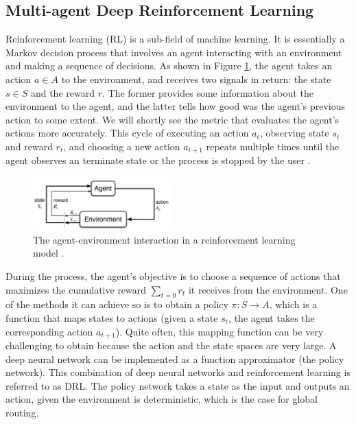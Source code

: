 \documentclass[conference]{IEEEtran}
\begin{document}
\subsection{Multi-agent Deep Reinforcement Learning}
Reinforcement learning (RL) is a sub-field of machine learning. It is essentially a Markov decision process that involves an agent interacting with an environment and making a sequence of decisions. As shown in Figure \ref{fig:rl}, the agent takes an action $a \in A$ to the environment, and receives two signals in return: the state $s \in S$ and the reward $r$. The former provides some information about the environment to the agent, and the latter tells how good was the agent's previous action to some extent. We will shortly see the metric that evaluates the agent's actions more accurately. This cycle of executing an action $a_{t}$, observing state $s_{t}$ and reward $r_{t}$, and choosing a new action $a_{t+1}$ repeats multiple times until the agent observes an terminate state or the process is stopped by the user \cite{SB}.

\begin{figure}[h!]
    \centering
    \includegraphics[width = 0.48\textwidth]{figures/rl.png}
    \caption{The agent-environment interaction in a reinforcement learning model \cite{SB}.}
    \label{fig:rl}
\end{figure}

During the process, the agent's objective is to choose a sequence of actions that maximizes the cumulative reward $\sum_{t=0} r_{t}
$ it receives from the environment. One of the methods it can achieve so is to obtain a policy $\pi:S \rightarrow A$, which is a function that maps states to actions (given a state $s_{t}$, the agent takes the corresponding action $a_{t+1}$). Quite often, this mapping function can be very challenging to obtain because the action and the state spaces are very large. A deep neural network can be implemented as a function approximator (the policy network). This combination of deep neural networks and reinforcement learning is referred to as DRL. The policy network takes a state as the input and outputs an action, 
given the environment is deterministic, which is the case for global routing.
\end{document}
